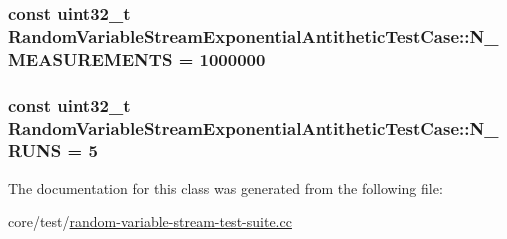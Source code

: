 \subsubsection[{\texorpdfstring{N\+\_\+\+M\+E\+A\+S\+U\+R\+E\+M\+E\+N\+TS}{N_MEASUREMENTS}}]{\setlength{\rightskip}{0pt plus 5cm}const uint32\+\_\+t Random\+Variable\+Stream\+Exponential\+Antithetic\+Test\+Case\+::\+N\+\_\+\+M\+E\+A\+S\+U\+R\+E\+M\+E\+N\+TS = 1000000\hspace{0.3cm}{\ttfamily [static]}}\hypertarget{classRandomVariableStreamExponentialAntitheticTestCase_a89d8b361cf56ca21687d35b0a7a89057}{}\label{classRandomVariableStreamExponentialAntitheticTestCase_a89d8b361cf56ca21687d35b0a7a89057}
\subsubsection[{\texorpdfstring{N\+\_\+\+R\+U\+NS}{N_RUNS}}]{\setlength{\rightskip}{0pt plus 5cm}const uint32\+\_\+t Random\+Variable\+Stream\+Exponential\+Antithetic\+Test\+Case\+::\+N\+\_\+\+R\+U\+NS = 5\hspace{0.3cm}{\ttfamily [static]}}\hypertarget{classRandomVariableStreamExponentialAntitheticTestCase_ae6a025b7e35adcd815a269e2882dbfa8}{}\label{classRandomVariableStreamExponentialAntitheticTestCase_ae6a025b7e35adcd815a269e2882dbfa8}


The documentation for this class was generated from the following file\+:\begin{DoxyCompactItemize}
\item 
core/test/\hyperlink{random-variable-stream-test-suite_8cc}{random-\/variable-\/stream-\/test-\/suite.\+cc}\end{DoxyCompactItemize}
